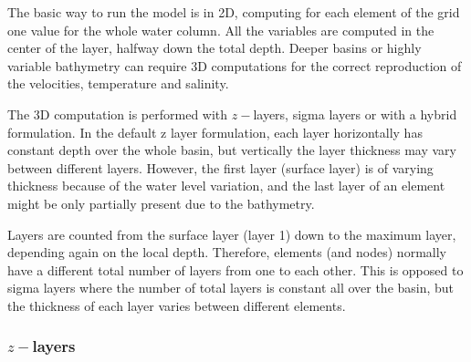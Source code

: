 
%
%
%
%
%
%
%


The basic way to run the model is in 2D, computing for each element of the
grid one value for the whole water column.  All the variables are computed
in the center of the layer, halfway down the total depth.  Deeper basins or highly 
variable bathymetry can require 3D computations for the correct reproduction 
of the velocities, temperature and salinity.

The 3D computation is performed with $z-$layers, sigma layers or with
a hybrid formulation.  In the default z layer formulation, each layer
horizontally has constant depth over the whole basin, but vertically
the layer thickness may vary between different layers. However, the
first layer (surface layer) is of varying thickness because of the water
level variation, and the last layer of an element might be only partially
present due to the bathymetry.

Layers are counted from the surface layer (layer 1) down to the
maximum layer, depending again on the local depth. Therefore, elements
(and nodes) normally have a different total number of layers from one to
each other. This is opposed to sigma layers where the number of total
layers is constant all over the basin, but the thickness of each layer
varies between different elements.

\subsubsection{$z-$layers}

